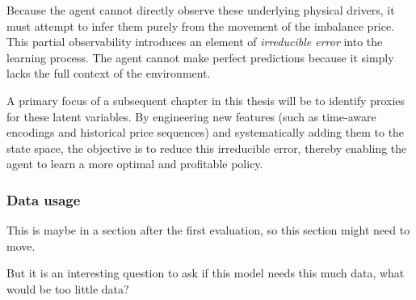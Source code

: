 Because the agent cannot directly observe these underlying physical drivers, it must attempt to infer them purely from the movement of the imbalance price. This partial observability introduces an element of \textit{irreducible error} into the learning process. The agent cannot make perfect predictions because it simply lacks the full context of the environment. 

A primary focus of a subsequent chapter in this thesis will be to identify proxies for these latent variables. By engineering new features (such as time-aware encodings and historical price sequences) and systematically adding them to the state space, the objective is to reduce this irreducible error, thereby enabling the agent to learn a more optimal and profitable policy.

\subsubsection{Data usage}
This is maybe in a section after the first evaluation, so this section might need to move.

But it is an interesting question to ask if this model needs this much data, what would be too little data?

